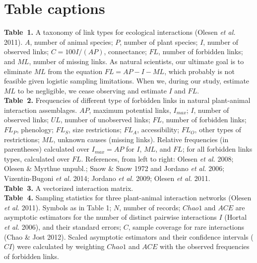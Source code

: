 \documentclass[12pt]{article}
\begin{document}
\section*{Table captions}
\noindent \textbf{Table~1.} A taxonomy of link types for ecological interactions (Olesen \emph{et al.} 2011). $A$, number of animal species; $P$, number of plant species; $I$, number of observed links; $C= 100 I/(AP)$, connectance; $FL$, number of forbidden links; and $ML$, number of missing links. As natural scientists, our ultimate goal is to eliminate $ML$ from the equation $FL = AP - I - ML$, which probably is not feasible given logistic sampling limitations. When we, during our study, estimate $ML$ to be negligible, we cease observing and estimate $I$ and $FL$.\\

\noindent \textbf{Table~2.} Frequencies of different type of forbidden links in natural plant-animal interaction assemblages. $AP$, maximum potential links, $I_{max}$; $I$, number of observed links; $UL$, number of unobserved links; $FL$, number of forbidden links; $FL_P$, phenology; $FL_S$, size restrictions; $FL_A$, accessibility; $FL_O$, other types of restrictions; $ML$, unknown causes (missing links). Relative frequencies (in parentheses) calculated over $I_{max}= AP$ for $I$, $ML$, and $FL$; for all forbidden links types, calculated over $FL$. References, from left to right: Olesen \emph{et al.} 2008; Olesen \& Myrthue unpubl.; Snow \& Snow 1972 and Jordano \emph{et al.} 2006; Vizentin-Bugoni \emph{et al.} 2014; Jordano \emph{et al.} 2009; Olesen \emph{et al.} 2011.  \\

\noindent \textbf{Table~3.} A vectorized interaction matrix.\\

\noindent \textbf{Table~4.} Sampling statistics for three plant-animal interaction networks (Olesen \emph{et al.} 2011). Symbols as in Table 1; $N$, number of records; $Chao1$ and $ACE$ are asymptotic estimators for the number of distinct pairwise interactions $I$ (Hortal \emph{et al.} 2006), and their standard errors; $C$, sample coverage for rare interactions (Chao \& Jost 2012). Scaled asymptotic estimators and their confidence intervals ($CI$) were calculated by weighting $Chao1$ and $ACE$ with the observed frequencies of forbidden links. \\
%
\newpage
\end{document}
